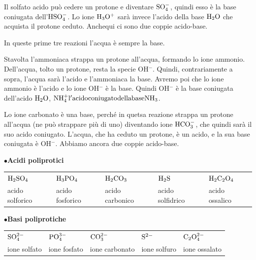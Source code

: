 \vspace{0.2cm}Il solfato acido può cedere un protone e diventare $\rm SO_4^-$, quindi esso è la base coniugata dell'$\rm HSO_4^-$. Lo ione $\rm H_3O^+$ sarà invece l'acido della base $\rm H_2O$ che acquista il protone ceduto. Anchequi ci sono due coppie acido-base.

\vspace{0.2cm}In queste prime tre reazioni l'acqua è sempre la base.

\vspace{0.2cm}

\vspace{0.2cm}Stavolta l'ammoniaca strappa un protone all'acqua, formando lo ione ammonio. Dell'acqua, tolto un protone, resta la specie OH$^-$. Quindi, contrariamente a sopra, l'acqua sarà l'acido e l'ammoniaca la base. Avremo poi che lo ione ammonio è l'acido e lo ione OH$^-$ è la base. Quindi OH$^-$ è la base coniugata dell'acido $\rm H_2O$, $\rm NH_4^+ l'acido coniugato della base NH_3$.

\vspace{0.2cm}

\vspace{0.2cm}Lo ione carbonato è una base, perché in quetsa reazione strappa un protone all'acqua (ne può strappare più di uno) diventando ione $\rm HCO_3^-$, che quindi sarà il suo acido coniugato. L'acqua, che ha ceduto un protone, è un acido, e la sua base coniugata è OH$^-$. Abbiamo ancora due coppie acido-base.

\vspace{0.2cm}$\bullet$\textbf{Acidi poliprotici}
\begin{center}
\begin{tabular}{lllll}
    $\rm H_2SO_4$ & $\rm H_3PO_4$ & $\rm H_2CO_3$ & $\rm H_2S$ & $\rm H_2C_2O_4$\\
    acido solforico & acido fosforico & acido carbonico & acido solfidrico & acido ossalico    
\end{tabular}
\end{center}
\vspace{0.2cm}$\bullet$\textbf{Basi poliprotiche}
\begin{center}
\begin{tabular}{lllll}
    $\rm SO_4^{2-}$ & $\rm PO_4^{3-}$ & $\rm CO_3^{2-}$ & $\rm S^{2-}$ & $\rm C_2O_4^{2-}$\\
    ione solfato & ione fosfato & ione carbonato & ione solfuro & ione ossalato    
\end{tabular}
\end{center}

